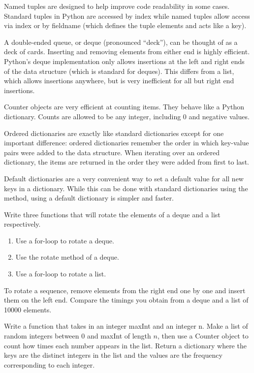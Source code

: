 Named tuples are designed to help improve code readability in some cases.
Standard tuples in Python are accessed by index while named tuples allow access via index or by  fieldname (which defines the tuple elements and acts like a key).

A double-ended queue, or deque (pronounced ``deck''), can be thought of as a deck of cards.
Inserting and removing elements from either end is highly efficient.
Python's deque implementation only allows insertions at the left and right ends of the data structure (which is standard for deques).
This differs from a list, which allows insertions anywhere, but is very inefficient for all but right end insertions.

Counter objects are very efficient at counting items.  They behave like a Python dictionary.  Counts are allowed to be any integer, including 0 and negative values.

Ordered dictionaries are exactly like standard dictionaries except for one important difference:
ordered dictionaries remember the order in which key-value pairs were added to the data structure.
When iterating over an ordered dictionary, the items are returned in the order they were added from first to last.

Default dictionaries are a very convenient way to set a default value for all new keys in a dictionary.
While this can be done with standard dictionaries using the  method, using a default dictionary is simpler and faster.

\begin{problem}
Write three functions that will rotate the elements of a deque and a list respectively.
\begin{enumerate}
\item Use a for-loop to rotate a deque.
\item Use the rotate method of a deque.
\item Use a for-loop to rotate a list.
\end{enumerate}

To rotate a sequence, remove elements from the right end one by one and insert them on the left end.
Compare the timings you obtain from a deque and a list of 10000 elements.
\end{problem}

\begin{problem}
Write a function that takes in an integer maxInt and an integer n.
Make a list of random integers between 0 and maxInt of length $n$, then use a Counter object to count how times each number appears in the list.
Return a dictionary where the keys are the distinct integers in the list and the values are the frequency corresponding to each integer.
\end{problem}

